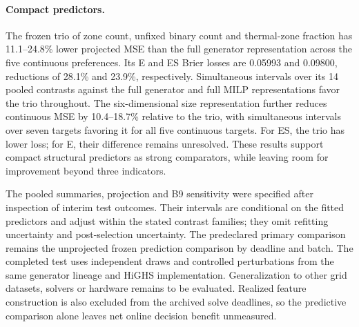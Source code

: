 \paragraph{Compact predictors.}
The frozen trio of zone count, unfixed binary count and thermal-zone fraction
has 11.1--24.8\% lower projected MSE than the full generator representation
across the five continuous preferences. Its E and ES Brier losses are
0.05993 and 0.09800, reductions of 28.1\% and 23.9\%, respectively.
Simultaneous intervals over its 14 pooled contrasts against the full
generator and full MILP representations favor the trio throughout. The
six-dimensional size representation further reduces continuous MSE by
10.4--18.7\% relative to the trio, with simultaneous intervals over seven
targets favoring it for all five continuous targets. For ES, the trio has
lower loss; for E, their difference remains unresolved. These results
support compact structural predictors as strong comparators, while leaving
room for improvement beyond three indicators.

The pooled summaries, projection and B9 sensitivity were specified after
inspection of interim test outcomes. Their intervals are conditional on
the fitted predictors and adjust within the stated contrast families;
they omit refitting uncertainty and post-selection uncertainty. The
predeclared primary comparison remains the unprojected frozen prediction
comparison by deadline and batch. The completed test uses independent
draws and controlled perturbations from the same generator lineage and
HiGHS implementation. Generalization to other grid datasets, solvers or
hardware remains to be evaluated. Realized feature construction is also
excluded from the archived solve deadlines, so the predictive comparison
alone leaves net online decision benefit unmeasured.
